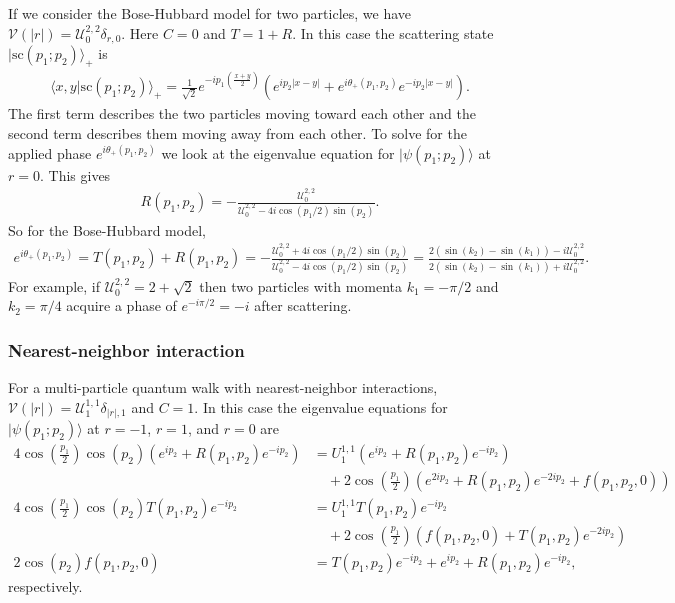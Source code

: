 \documentclass[../thesis-main/thesis-main]{subfiles}
\begin{document}
If we consider the Bose-Hubbard model for two particles, we have $\mathcal{V}(|r|) = \mathcal{U}_0^{2,2}\delta_{r,0}$. Here $C=0$ and $T=1+R$.  In this case the scattering state $|\mathrm{sc}(p_1;p_2)\rangle_+$ is
\begin{align}
\langle x,y|\mathrm{sc}(p_1;p_2)\rangle_+=\frac{1}{\sqrt{2}}e^{-ip_1 \left(\frac{x+y}{2}\right)}\left(e^{ip_2 |x-y|}+e^{i\theta_+(p_1,p_2)}e^{-ip_2 |x-y|}\right).
\end{align}
The first term describes the two particles moving toward each other and the second term describes them moving away from each other. To solve for the applied phase $e^{i\theta_+(p_1,p_2)}$ we look at the eigenvalue equation for $|\psi(p_1;p_2)\rangle$ at $r=0$. This gives
\begin{align}
  R(p_1,p_2) =- \frac{\mathcal{U}_0^{2,2}}{\mathcal{U}_0^{2,2} - 4i\cos({p_1}/{2})\sin(p_2)}.
\end{align}
So for the Bose-Hubbard model,
\begin{align}
  e^{i \theta_{+} (p_1,p_2)} = T(p_1,p_2) + R(p_1,p_2) = - \frac{ \mathcal{U}_0^{2,2} + 4 i \cos({p_1}/{2}) \sin(p_2)}{\mathcal{U}_0^{2,2} - 4 i \cos({p_1}/{2}) \sin(p_2)} =  \frac{2 \left(\sin(k_2) - \sin(k_1)\right) - i \mathcal{U}_0^{2,2}}{2 \left(\sin(k_2) - \sin(k_1)\right) + i \mathcal{U}_0^{2,2}}.
\end{align}
For example, if $\mathcal{U}_0^{2,2} = 2+\sqrt{2}$ then two particles with momenta $k_1 =-{ \pi}/{2}$ and $k_2={\pi}/{4}$ acquire a phase of $e^{-i\pi/2}= -i$ after scattering.

\subsubsection{Nearest-neighbor interaction}


For a multi-particle quantum walk with nearest-neighbor interactions, $\mathcal{V}(|r|)=\mathcal{U}_1^{1,1}\delta_{|r|,1}$ and $C=1$.  In this case the eigenvalue equations for $|\psi(p_1;p_2)\rangle$ at $r=-1$, $r=1$, and $r=0$ are
\begin{align}
 4 \cos\left(\frac{p_1}{2}\right)  \cos(p_2) ( e^{i p_2} + R(p_1,p_2) e^{-i p_2} ) &= U_1^{1,1} ( e^{i p_2} + R(p_1,p_2) e^{-i p_2}) \\
& \quad + 2\cos\left(\frac{p_1}{2}\right) \left( e^{2i p_2} + R(p_1,p_2) e^{-2i p_2}+f(p_1,p_2,0)\right) \\
 4 \cos\left(\frac{p_1}{2}\right)  \cos(p_2) T(p_1,p_2) e^{-ip_2} & =U_1^{1,1}T(p_1,p_2)e^{-ip_2}\\
& \quad +2\cos \left(\frac{p_1}{2}\right)\left(f(p_1,p_2,0)+T(p_1,p_2)e^{-2ip_2}\right)\\
2 \cos(p_2) f(p_1,p_2,0) &=T(p_1,p_2)e^{-ip_2}+e^{ip_2}+R(p_1,p_2)e^{-ip_2},
\end{align}
respectively.
\end{document}
